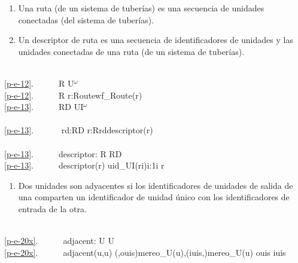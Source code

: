 \label{primer-pipe}\HHHH

\begin{enumerate}\setei
\item \label{p-e-12} Una ruta (de un sistema de tuberías) es una secuencia de
                     unidades conectadas (del sistema de tuberías).
\item \label{p-e-13} Un descriptor de ruta es una secuencia de identificadores de unidades
                     y las unidades conectadas de una ruta
                     (de un sistema de tuberías).
\savei\end{enumerate}

\bp
\>\ \\
\ref{p-e-12}.\ \ \ \ \ \ R{\PRIM} {\EQ} U$^{\omega}$ \\
\ref{p-e-12}.\ \ \ \ \ \ R {\EQ} {\LBRACE}{\BAR} r:Route{\PRIM}{\RDOT}wf\_Route(r) {\BAR}{\RBRACE} \\
\ref{p-e-13}.\ \ \ \ \ \ RD {\EQ} UI$^{\omega}$ \\
\>\ \\
\ref{p-e-13}.\ \ \ \ \ \ {\ALL} rd:RD {\RDOT} {\EXISTS} r:R{\RDOT}rd{\EQ}descriptor(r) \\
\>\ \\
\ref{p-e-13}.\ \ \ \ \ \ descriptor: R {\RIGHTARROW} RD \\
\ref{p-e-13}.\ \ \ \ \ \ descriptor(r) {\IS} {\LANGLE}uid\_UI(r{\LBRACKET}i{\RBRACKET}){\BAR}i:1{\LEQ}i{\LEQ} r{\RANGLE}\ \ \ 
\ep

\mnewfoil\LLLL\HHHH

\begin{enumerate}\setei
\item \label{p-e-20x}   Dos unidades son adyacentes si los identificadores de unidades de salida
  de una comparten un identificador de unidad único con los identificadores de entrada
  de la otra.
\savei\end{enumerate}

\bp
\>\  \\
\ref{p-e-20x}.\ \ \ \ \ \ adjacent: U {\TIMES} U {\RIGHTARROW}  \\
\ref{p-e-20x}.\ \ \ \ \ \ adjacent(u,u{\PRIM}) {\IS} \kw{let} (,ouis){\EQ}mereo\_U(u),(iuis,){\EQ}mereo\_U(u{\PRIM})  ouis {\INTER} iuis {\NOTEQ} {\LBRACE}{\RBRACE} 
\ep

